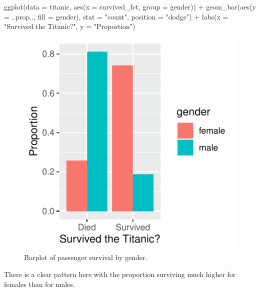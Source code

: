 \documentclass[
  letterpaper,
  DIV=11,
  numbers=noendperiod]{scrartcl}
\newenvironment{Shaded}{\begin{snugshade}}{\end{snugshade}}
\newcommand{\AttributeTok}[1]{\textcolor[rgb]{0.40,0.45,0.13}{#1}}
\newcommand{\FunctionTok}[1]{\textcolor[rgb]{0.28,0.35,0.67}{#1}}
\newcommand{\NormalTok}[1]{\textcolor[rgb]{0.00,0.23,0.31}{#1}}
\newcommand{\SpecialCharTok}[1]{\textcolor[rgb]{0.37,0.37,0.37}{#1}}
\newcommand{\StringTok}[1]{\textcolor[rgb]{0.13,0.47,0.30}{#1}}
\begin{document}
\begin{tcolorbox}
\begin{Shaded}
\begin{Highlighting}[]
\FunctionTok{ggplot}\NormalTok{(}\AttributeTok{data =}\NormalTok{ titanic, }\FunctionTok{aes}\NormalTok{(}\AttributeTok{x =}\NormalTok{ survived\_fct, }\AttributeTok{group =}\NormalTok{ gender)) }\SpecialCharTok{+}
  \FunctionTok{geom\_bar}\NormalTok{(}\FunctionTok{aes}\NormalTok{(}\AttributeTok{y =}\NormalTok{ ..prop.., }\AttributeTok{fill =}\NormalTok{ gender), }\AttributeTok{stat =} \StringTok{"count"}\NormalTok{, }\AttributeTok{position =} \StringTok{"dodge"}\NormalTok{) }\SpecialCharTok{+}
  \FunctionTok{labs}\NormalTok{(}\AttributeTok{x =} \StringTok{"Survived the Titanic?"}\NormalTok{, }\AttributeTok{y =} \StringTok{"Proportion"}\NormalTok{)}
\end{Highlighting}
\end{Shaded}

\begin{figure}[H]

{\centering \includegraphics{about_files/figure-pdf/unnamed-chunk-12-1.pdf}

}

\caption{Barplot of passenger survival by gender.}

\end{figure}%

There is a clear pattern here with the proportion surviving much higher
for females than for males.


\end{tcolorbox}
\end{document}
